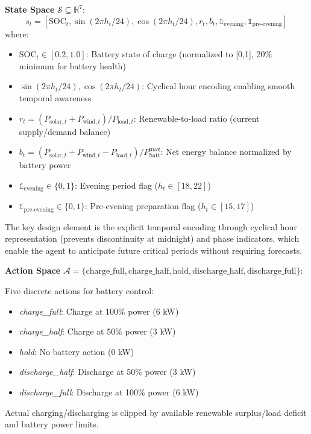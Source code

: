 \documentclass[11pt,a4paper]{article}
\begin{document}
\textbf{State Space} $\mathcal{S} \subseteq \mathbb{R}^7$: 
\begin{equation}
s_t = [\text{SOC}_t, \sin(2\pi h_t/24), \cos(2\pi h_t/24), r_t, b_t, \mathbb{1}_{\text{evening}}, \mathbb{1}_{\text{pre-evening}}]
\end{equation}
where:
\begin{itemize}
    \item $\text{SOC}_t \in [0.2, 1.0]$: Battery state of charge (normalized to [0,1], 20\% minimum for battery health)
    \item $\sin(2\pi h_t/24), \cos(2\pi h_t/24)$: Cyclical hour encoding enabling smooth temporal awareness
    \item $r_t = (P_{\text{solar},t} + P_{\text{wind},t}) / P_{\text{load},t}$: Renewable-to-load ratio (current supply/demand balance)
    \item $b_t = (P_{\text{solar},t} + P_{\text{wind},t} - P_{\text{load},t}) / P_{\text{batt}}^{\text{max}}$: Net energy balance normalized by battery power
    \item $\mathbb{1}_{\text{evening}} \in \{0,1\}$: Evening period flag ($h_t \in [18, 22]$)
    \item $\mathbb{1}_{\text{pre-evening}} \in \{0,1\}$: Pre-evening preparation flag ($h_t \in [15, 17]$)
\end{itemize}

The key design element is the explicit temporal encoding through cyclical hour representation (prevents discontinuity at midnight) and phase indicators, which enable the agent to anticipate future critical periods without requiring forecasts.

\textbf{Action Space} $\mathcal{A} = \{\text{charge\_full}, \text{charge\_half}, \text{hold}, \text{discharge\_half}, \text{discharge\_full}\}$: 

Five discrete actions for battery control:
\begin{itemize}
    \item \textit{charge\_full}: Charge at 100\% power (6 kW)
    \item \textit{charge\_half}: Charge at 50\% power (3 kW)
    \item \textit{hold}: No battery action (0 kW)
    \item \textit{discharge\_half}: Discharge at 50\% power (3 kW)
    \item \textit{discharge\_full}: Discharge at 100\% power (6 kW)
\end{itemize}

Actual charging/discharging is clipped by available renewable surplus/load deficit and battery power limits.
\end{document}
